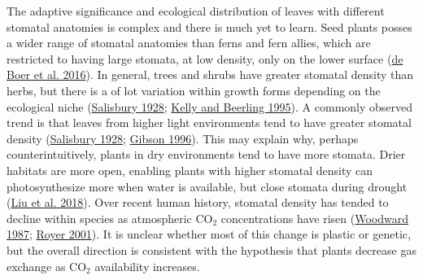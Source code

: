 \documentclass[
  12pt,
]{article}
\begin{document}
The adaptive significance and ecological distribution of leaves with different stomatal anatomies is complex and there is much yet to learn. Seed plants posses a wider range of stomatal anatomies than ferns and fern allies, which are restricted to having large stomata, at low density, only on the lower surface (\protect\hyperlink{ref-de_boer_optimal_2016}{de Boer et al. 2016}). In general, trees and shrubs have greater stomatal density than herbs, but there is a of lot variation within growth forms depending on the ecological niche (\protect\hyperlink{ref-salisbury_i_1928}{Salisbury 1928}; \protect\hyperlink{ref-kelly_plant_1995}{Kelly and Beerling 1995}). A commonly observed trend is that leaves from higher light environments tend to have greater stomatal density (\protect\hyperlink{ref-salisbury_i_1928}{Salisbury 1928}; \protect\hyperlink{ref-gibson_structure-function_1996}{Gibson 1996}). This may explain why, perhaps counterintuitively, plants in dry environments tend to have more stomata. Drier habitats are more open, enabling plants with higher stomatal density can photosynthesize more when water is available, but close stomata during drought (\protect\hyperlink{ref-liu_variation_2018}{Liu et al. 2018}). Over recent human history, stomatal density has tended to decline within species as atmospheric CO\(_2\) concentrations have risen (\protect\hyperlink{ref-woodward_stomatal_1987}{Woodward 1987}; \protect\hyperlink{ref-royer_stomatal_2001}{Royer 2001}). It is unclear whether most of this change is plastic or genetic, but the overall direction is consistent with the hypothesis that plants decrease gas exchange as CO\(_2\) availability increases.
\end{document}
